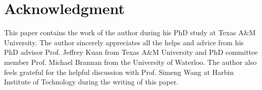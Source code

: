 \documentclass[table,a4paper,reqno]{amsart}
\numberwithin{equation}{section}
\theoremstyle{definition}
\begin{document}


\section*{Acknowledgment}
This paper contains the work of the author during his PhD study at Texas A\&M University. The author sincerely appreciates all the helps and advice from his PhD advisor Prof. Jeffrey Kuan from Texas A\&M University and PhD committee member Prof. Michael Brannan from the University of Waterloo. The author also feels grateful for the helpful discussion with Prof. Simeng Wang at Harbin Institute of Technology during the writing of this paper.



\appendix
\end{document}
